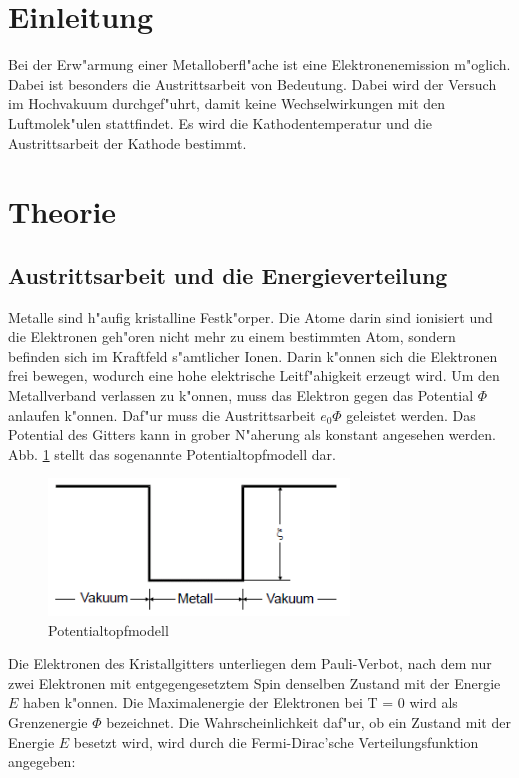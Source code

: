 \section{Einleitung} %
\label{sec:einleitung}

Bei der Erw"armung einer Metalloberfl"ache ist eine Elektronenemission m"oglich.
Dabei ist besonders die Austrittsarbeit von Bedeutung.
Dabei wird der Versuch im Hochvakuum durchgef"uhrt, damit keine Wechselwirkungen mit den Luftmolek"ulen stattfindet.
Es wird die Kathodentemperatur und die Austrittsarbeit der Kathode bestimmt.

\section{Theorie} %
\label{sec:theorie}

\subsection{Austrittsarbeit und die Energieverteilung} %
\label{sub:austrittsarbeit_und_die_energieverteilung}

Metalle sind h"aufig kristalline Festk"orper.
Die Atome darin sind ionisiert und die Elektronen geh"oren nicht mehr zu einem bestimmten Atom, sondern befinden sich im Kraftfeld s"amtlicher Ionen.
Darin k"onnen sich die Elektronen frei bewegen, wodurch eine hohe elektrische Leitf"ahigkeit erzeugt wird.
Um den Metallverband verlassen zu k"onnen, muss das Elektron gegen das Potential $\Phi$ anlaufen k"onnen.
Daf"ur muss die Austrittsarbeit $e_\mathrm{0}\Phi$ geleistet werden.
Das Potential des Gitters kann in grober N"aherung als konstant angesehen werden.
Abb. \ref{potential_topf} stellt das sogenannte Potentialtopfmodell dar.

\begin{figure}[!h]
	\centering
	\includegraphics[width = 8cm]{img/Potentialtopf.PNG}
	\caption{Potentialtopfmodell}
	\label{potential_topf}
\end{figure}

Die Elektronen des Kristallgitters unterliegen dem Pauli-Verbot, nach dem nur zwei Elektronen mit entgegengesetztem Spin denselben Zustand mit der Energie $E$ haben k"onnen.
Die Maximalenergie der Elektronen bei T = 0 wird als Grenzenergie $\Phi$ bezeichnet.
Die Wahrscheinlichkeit daf"ur, ob ein Zustand mit der Energie $E$ besetzt wird, wird durch die Fermi-Dirac'sche Verteilungsfunktion angegeben:

